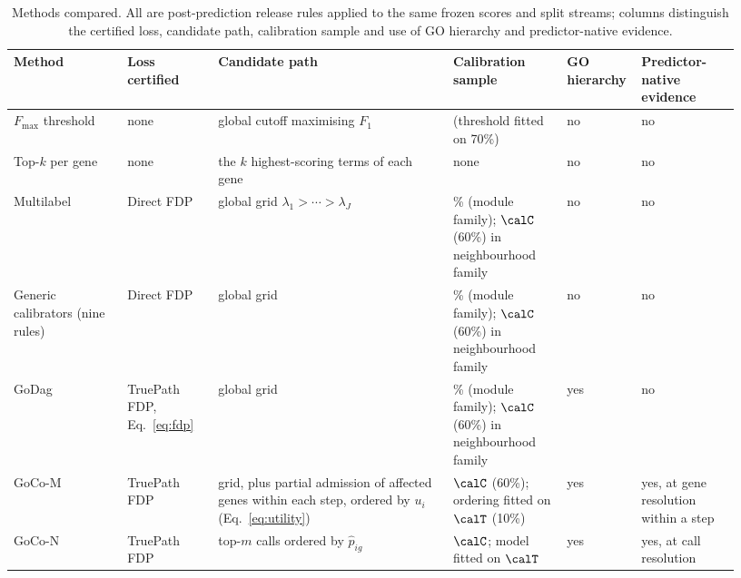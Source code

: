 \begin{table}[!t]
\centering
\caption{Methods compared. All are post-prediction release rules applied to the same frozen scores and split streams; columns distinguish the certified loss, candidate path, calibration sample and use of GO hierarchy and predictor-native evidence.}
\label{tab:methods}
\scriptsize
\setlength{\tabcolsep}{4pt}
\begin{tabular}{>{\raggedright\arraybackslash}p{0.15\linewidth}>{\raggedright\arraybackslash}p{0.12\linewidth}>{\raggedright\arraybackslash}p{0.31\linewidth}>{\raggedright\arraybackslash}p{0.15\linewidth}>{\raggedright\arraybackslash}p{0.07\linewidth}>{\raggedright\arraybackslash}p{0.13\linewidth}}
\toprule
Method & Loss certified & Candidate path & Calibration sample & GO hierarchy & Predictor-native evidence \\
\midrule
$F_{\max}$ threshold & none & global cutoff maximising $F_1$ & (threshold fitted on 70\%) & no & no \\
Top-$k$ per gene & none & the $k$ highest-scoring terms of each gene & none & no & no \\
Multilabel \cite{boger2025} & Direct FDP & global grid $\lambda_1>\cdots>\lambda_J$ & 70\% (module family); $\calC$ (60\%) in neighbourhood family & no & no \\
Generic calibrators (nine rules) & Direct FDP & global grid & 70\% (module family); $\calC$ (60\%) in neighbourhood family & no & no \\
GoDag & TruePath FDP, Eq.~\eqref{eq:fdp} & global grid & 70\% (module family); $\calC$ (60\%) in neighbourhood family & yes & no \\
GoCo-M & TruePath FDP & grid, plus partial admission of affected genes within each step, ordered by $u_i$ (Eq.~\eqref{eq:utility}) & $\calC$ (60\%); ordering fitted on $\calT$ (10\%) & yes & yes, at gene resolution within a step \\
GoCo-N & TruePath FDP & top-$m$ calls ordered by $\widehat p_{ig}$ & $\calC$; model fitted on $\calT$ & yes & yes, at call resolution \\
\bottomrule
\end{tabular}
\end{table}
